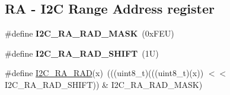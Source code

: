 \subsection*{RA -\/ I2C Range Address register}
\begin{DoxyCompactItemize}
\item 
\mbox{\label{group___i2_c___register___masks_gaa39c37c0d41e4cdafc00884a2fc791fa}} 
\#define {\bfseries I2\+C\+\_\+\+R\+A\+\_\+\+R\+A\+D\+\_\+\+M\+A\+SK}~(0x\+F\+E\+U)
\item 
\mbox{\label{group___i2_c___register___masks_ga8571ae2c33f4ea6503f568c2151ef2a9}} 
\#define {\bfseries I2\+C\+\_\+\+R\+A\+\_\+\+R\+A\+D\+\_\+\+S\+H\+I\+FT}~(1\+U)
\item 
\#define \mbox{\hyperlink{group___i2_c___register___masks_gae2a3d76c69fe5e8947660274f6744031}{I2\+C\+\_\+\+R\+A\+\_\+\+R\+AD}}(x)~(((uint8\+\_\+t)(((uint8\+\_\+t)(x)) $<$$<$ I2\+C\+\_\+\+R\+A\+\_\+\+R\+A\+D\+\_\+\+S\+H\+I\+FT)) \& I2\+C\+\_\+\+R\+A\+\_\+\+R\+A\+D\+\_\+\+M\+A\+SK)
\end{DoxyCompactItemize}
